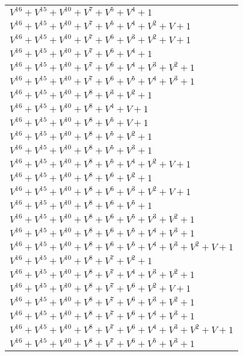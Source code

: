 \documentclass[12pt]{article}
\begin{document}
\begin{adjustwidth}{-4cm}{}
\begin{center}
\begin{longtable}{|l|}
$V^{16}  +V^{15}  +V^{10}  +V^{7}  +V^{5}  +V^{4}  + 1$ \\
$V^{16}  +V^{15}  +V^{10}  +V^{7}  +V^{5}  +V^{4}  +V^{2}  + V + 1$ \\
$V^{16}  +V^{15}  +V^{10}  +V^{7}  +V^{6}  +V^{3}  +V^{2}  + V + 1$ \\
$V^{16}  +V^{15}  +V^{10}  +V^{7}  +V^{6}  +V^{4}  + 1$ \\
$V^{16}  +V^{15}  +V^{10}  +V^{7}  +V^{6}  +V^{4}  +V^{3}  +V^{2}  + 1$ \\
$V^{16}  +V^{15}  +V^{10}  +V^{7}  +V^{6}  +V^{5}  +V^{4}  +V^{3}  + 1$ \\
$V^{16}  +V^{15}  +V^{10}  +V^{8}  +V^{3}  +V^{2}  + 1$ \\
$V^{16}  +V^{15}  +V^{10}  +V^{8}  +V^{4}  + V + 1$ \\
$V^{16}  +V^{15}  +V^{10}  +V^{8}  +V^{5}  + V + 1$ \\
$V^{16}  +V^{15}  +V^{10}  +V^{8}  +V^{5}  +V^{2}  + 1$ \\
$V^{16}  +V^{15}  +V^{10}  +V^{8}  +V^{5}  +V^{3}  + 1$ \\
$V^{16}  +V^{15}  +V^{10}  +V^{8}  +V^{5}  +V^{4}  +V^{2}  + V + 1$ \\
$V^{16}  +V^{15}  +V^{10}  +V^{8}  +V^{6}  +V^{2}  + 1$ \\
$V^{16}  +V^{15}  +V^{10}  +V^{8}  +V^{6}  +V^{3}  +V^{2}  + V + 1$ \\
$V^{16}  +V^{15}  +V^{10}  +V^{8}  +V^{6}  +V^{5}  + 1$ \\
$V^{16}  +V^{15}  +V^{10}  +V^{8}  +V^{6}  +V^{5}  +V^{3}  +V^{2}  + 1$ \\
$V^{16}  +V^{15}  +V^{10}  +V^{8}  +V^{6}  +V^{5}  +V^{4}  +V^{3}  + 1$ \\
$V^{16}  +V^{15}  +V^{10}  +V^{8}  +V^{6}  +V^{5}  +V^{4}  +V^{3}  +V^{2}  + V + 1$ \\
$V^{16}  +V^{15}  +V^{10}  +V^{8}  +V^{7}  +V^{2}  + 1$ \\
$V^{16}  +V^{15}  +V^{10}  +V^{8}  +V^{7}  +V^{4}  +V^{3}  +V^{2}  + 1$ \\
$V^{16}  +V^{15}  +V^{10}  +V^{8}  +V^{7}  +V^{6}  +V^{2}  + V + 1$ \\
$V^{16}  +V^{15}  +V^{10}  +V^{8}  +V^{7}  +V^{6}  +V^{3}  +V^{2}  + 1$ \\
$V^{16}  +V^{15}  +V^{10}  +V^{8}  +V^{7}  +V^{6}  +V^{4}  +V^{3}  + 1$ \\
$V^{16}  +V^{15}  +V^{10}  +V^{8}  +V^{7}  +V^{6}  +V^{4}  +V^{3}  +V^{2}  + V + 1$ \\
$V^{16}  +V^{15}  +V^{10}  +V^{8}  +V^{7}  +V^{6}  +V^{5}  +V^{3}  + 1$ \\

\end{longtable}
\end{center}
\end{adjustwidth}
\end{document}
